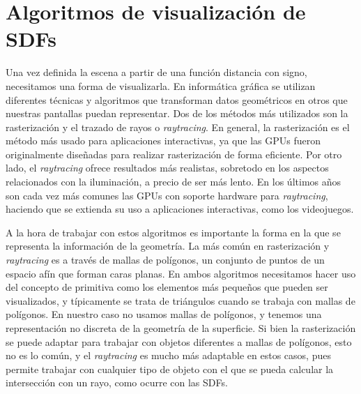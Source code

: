 \chapter{Algoritmos de visualización de SDFs}\label{cap:2}
Una vez definida la escena a partir de una función distancia con signo, necesitamos una forma de visualizarla. En informática gráfica se utilizan diferentes técnicas y algoritmos que transforman datos geométricos en otros que nuestras pantallas puedan representar. Dos de los métodos más utilizados son la rasterización y el trazado de rayos o \textit{raytracing}. En general, la rasterización es el método más usado para aplicaciones interactivas, ya que las GPUs fueron originalmente diseñadas para realizar rasterización de forma eficiente. Por otro lado, el \textit{raytracing} ofrece resultados más realistas, sobretodo en los aspectos relacionados con la iluminación, a precio de ser más lento. En los últimos años son cada vez más comunes las GPUs con soporte hardware para \textit{raytracing}, haciendo que se extienda su uso a aplicaciones interactivas, como los videojuegos.\newline

A la hora de trabajar con estos algoritmos es importante la forma en la que se representa la información de la geometría. La más común en rasterización y \textit{raytracing} es a través de mallas de polígonos, un conjunto de puntos de un espacio afín que forman caras planas. En ambos algoritmos necesitamos hacer uso del concepto de primitiva como los elementos más pequeños que pueden ser visualizados, y típicamente se trata de triángulos cuando se trabaja con mallas de polígonos. En nuestro caso no usamos mallas de polígonos, y tenemos una representación no discreta de la geometría de la superficie. Si bien la rasterización se puede adaptar para trabajar con objetos diferentes a mallas de polígonos, esto no es lo común, y el \textit{raytracing} es mucho más adaptable en estos casos, pues permite trabajar con cualquier tipo de objeto con el que se pueda calcular la intersección con un rayo, como ocurre con las SDFs.\newline

